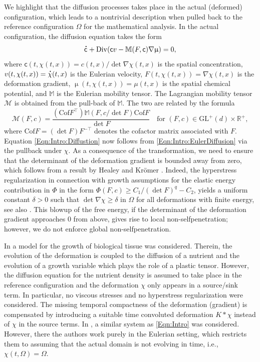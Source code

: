\documentclass[a4paper,12pt]{article}
\newcommand{\R}{\mathbb{R}}
\newcommand{\M}{\mathbb{M}}
\newcommand{\calM}{\mathcal{M}}
\newcommand{\bbM}{\mathbb{M}}
\newcommand{\Cof}{\mathrm{Cof}}
\newcommand\DT[1]{\mathchoice
                 {{\buildrel{\hspace*{.1em}\text{\LARGE.}}\over{#1}}}
                 {{\buildrel{\hspace*{.1em}\text{\Large.}}\over{#1}}}
                 {{\buildrel{\hspace*{.1em}\text{\large.}}\over{#1}}}
                 {{\buildrel{\hspace*{.1em}\text{\large.}}\over{#1}}}}
\renewcommand{\dot}{\DT}
\newcommand{\GL}{\mathrm{GL}}
\theoremstyle{plain}
\theoremstyle{definition}
\numberwithin{equation}{section}
\begin{document}
We highlight that the diffusion processes takes place 
in the actual (deformed) configuration, which leads to 
a nontrivial description when pulled back to the reference 
configuration $\Omega$ for the mathematical analysis. 
In the actual configuration, the diffusion equation takes the 
form 
\begin{equation}
	\label{Eqn:Intro:EulerDiffusion}
\dot{ \mathsf{c}} + \mathrm{Div}(\mathsf{c} v - \M(F,\mathsf{c}) \nabla\upmu ) =0,
\end{equation}
where $\mathsf{c}(t,\chi(t,x)) = c(t,x)/\det \nabla\chi(t,x)$ is the spatial 
concentration, $v(t,\chi(t,x)) = \dot\chi(t,x)$ is the Eulerian velocity, $F(t,\chi(t,x)) = \nabla\chi(t,x)$ 
is the deformation gradient, $\upmu(t,\chi(t,x)) = \mu(t,x)$ is the spatial chemical potential,
and $\bbM$ is the Eulerian mobility tensor.
The Lagrangian mobility tensor $\calM$ is obtained from 
the pull-back of $\bbM$. The two are related
by the formula
\[
	\calM(F,c) = \frac{(\Cof F^\top) \M(F,c/\!\det F)\Cof F}{\det F}\quad \text{for }(F,c)\in \GL^+(d)\times \R^+,
\]
where $\Cof F = (\det F) F^{-\top}$ denotes the cofactor matrix associated with $F$.
Equation \eqref{Eqn:Intro:Diffustion} now follows from \eqref{Eqn:Intro:EulerDiffusion}
via the pullback under $\chi$.
As a consequence of the transformation, 
we need to ensure that the determinant of the deformation 
gradient is bounded away from zero, which follows from a result 
by Healey and Kr\"omer \cite{HeaKro2009IwSiSGNE}. Indeed, the 
hyperstress regularization in connection with  
growth assumptions for the elastic energy contribution in $\Phi$
in the form $\Phi(F,c) \geq C_1/(\det F)^q -C_2$, yields a 
uniform constant $\delta>0$ such that $\det \nabla\chi \geq \delta$
in $\Omega$ for all deformations with finite energy, see also \cite[Thm.~3.1]{MieRou2020TVKVR}. 
This blowup of the free energy, if the determinant of the deformation gradient approaches $0$ from above,
gives rise to local non-selfpenetration; however, we do not enforce global non-selfpenetration.


In \cite{DaNiSt2022ERMEM} a model for the growth of biological tissue was considered. Therein, the evolution of the 
deformation is coupled to the diffusion of a nutrient and the evolution of a growth variable which plays the role of a plastic tensor. However, the diffusion equation for the nutrient density is assumed to take place in the reference configuration and the deformation $\chi$ only appears in a source/sink term. In particular, 
no viscous stresses and no hyperstress regularization were considered. The missing temporal compactness of the deformation (gradient) is compensated by introducing a suitable time convoluted deformation $K*\chi$ instead of $\chi$ in the source terms. In \cite{RouSte2022*VSPS}, a similar system as \eqref{Eqn:Intro} was considered. However, there the authors 
work purely in the Eulerian setting, which restricts them to assuming that the actual domain is not evolving in time, i.e., $\chi(t,\Omega) = \Omega$.
\end{document}
